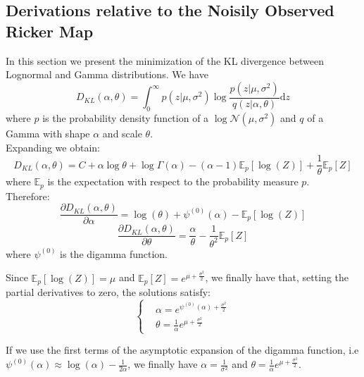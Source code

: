 \documentclass[12pt]{article}
\begin{document}
\clearpage
\begin{appendices}
	\section{Derivations relative to the Noisily Observed Ricker Map} \label{KLRicker}
	In this section we present the minimization of the KL divergence between Lognormal and Gamma distributions.
	We have
	\begin{equation*}
	D_{KL}(\alpha, \theta) = \int_{0}^{\infty}{p(z|\mu, \sigma^2)\log\frac{p(z|\mu, \sigma^2)}{q(z|\alpha, \theta)}\mathrm{d}z}
	\end{equation*}
	where $p$ is the probability density function of a $\log\mathcal{N}(\mu, \sigma^2)$ and $q$ of a Gamma with shape $\alpha$ and scale $\theta$. \\
	Expanding we obtain:
	\begin{equation*}
	D_{KL}(\alpha, \theta) = C + \alpha\log\theta + \log\Gamma(\alpha) - (\alpha-1)\mathbb{E}_p[\log(Z)] + \frac{1}{\theta}\mathbb{E}_p[Z]
	\end{equation*}
	where $\mathbb{E}_p$ is the expectation with respect to the probability measure $p$.\\
	Therefore:
	\begin{equation*}
	\frac{\partial D_{KL}(\alpha, \theta)}{\partial \alpha} = \log(\theta) + \psi^{(0)}(\alpha)-\mathbb{E}_p[\log(Z)]
	\end{equation*}
	\begin{equation*}
	\frac{\partial D_{KL}(\alpha, \theta)}{\partial \theta} = \frac{\alpha}{\theta} - \frac{1}{\theta^2}\mathbb{E}_p[Z]
	\end{equation*}
	where $\psi^{(0)}$ is the digamma function.
	
	Since $\mathbb{E}_p[\log(Z)]=\mu$ and $\mathbb{E}_p[Z] = e^{\mu+\frac{\sigma^2}{2}}$, we finally have that, setting the partial derivatives to zero, the solutions satisfy:
	\[	\begin{cases}
	& \alpha=e^{\psi^{(0)}(\alpha)+\frac{\sigma^2}{2}} \\
	& \theta=\frac{1}{\alpha}e^{\mu+\frac{\sigma^2}{2}}
	\end{cases}\]
	
	If we use the first terms of the asymptotic expansion of the digamma function, i.e $\psi^{(0)}(\alpha) \approx \log(\alpha)-\frac{1}{2\alpha}$, we finally have $\alpha =\frac{1}{\sigma^2}$ and $\theta=\frac{1}{\alpha}e^{\mu+\frac{\sigma^2}{2}}$. \\
	

\end{appendices}
\end{document}
